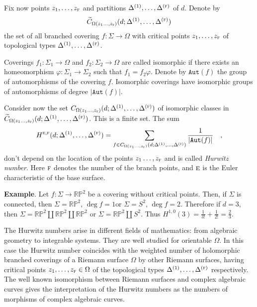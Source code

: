 \documentclass[a4paper,10pt]{article}
\theoremstyle{plain}
\theoremstyle{remark}
\begin{document}
Fix now points $z_1,\dots,z_{\textsc{f}}$ and partitions $\Delta^{(1)},\dots,\Delta^{(\textsc{f})}$ of $d$. Denote by
\[\widetilde{C}_{\Omega (z_1\dots,z_{\textsc{f}})} (d;\Delta^{(1)},\dots,\Delta^{(\textsc{f})})\]
the set of all branched covering $f:\Sigma\rightarrow\Omega$ with critical points $z_1,\dots,z_{\textsc{f}}$ of topological
types  $\Delta^{(1)},\dots,\Delta^{(\textsc{f})}$.

Coverings $f_1:\Sigma_1\rightarrow\Omega$ and $f_2:\Sigma_2\rightarrow\Omega$ are called isomorphic if there exists an
homeomorphism $\varphi:\Sigma_1\rightarrow\Sigma_2$ such that $f_1=f_2\varphi$. Denote by $\texttt{Aut}(f)$  the group of
automorphisms of the covering $f$. Isomorphic coverings have isomorphic groups of automorphisms of degree $|\texttt{Aut}(f)|$.

Consider now the set $C_{\Omega (z_1\dots,z_{\textsc{f}})} (d;\Delta^{(1)},\dots,\Delta^{(\textsc{f})})$ of isomorphic classes
in $\widetilde{C}_{\Omega (z_1\dots,z_{\textsc{f}})} (d;\Delta^{(1)},\dots,\Delta^{(\textsc{f})})$. This is a finite set.
The sum
\[
H^{\textsc{e},\textsc{f}}(d;\Delta^{(1)},\dots,\Delta^{(\textsc{f})})=
\sum\limits_{f\in C_{\Omega (z_1\dots,z_{\textsc{f}})}(d;\Delta^{(1)},\dots,
\Delta^{(\textsc{f})})}\frac{1} {|\texttt{Aut}(f)|}\quad,
\]
don't depend on the location of the points $z_1\dots,z_{\textsc{f}}$ and is called \textit{Hurwitz number}.
Here $\textsc{f}$ denotes the number of the branch points, and $\textsc{e}$ is the Euler characteristic of the base surface.

\vspace{1ex}
{\bf Example}.
Let $f:\Sigma\rightarrow\mathbb{RP}^2$ be a covering without critical points.
Then, if $\Sigma$ is connected, then $\Sigma=\mathbb{RP}^2$,
$\deg f=1$\quad or $\Sigma=S^2$, $\deg f=2$. Therefore if $d=3$, then
$\Sigma=\mathbb{RP}^2\coprod\mathbb{RP}^2\coprod\mathbb{RP}^2$ or $\Sigma=\mathbb{RP}^2\coprod S^2$.
Thus $H^{1,0}(3)=\frac{1}{3!}+\frac{1}{2!}=\frac{2}{3}$.


\vspace{1ex}

The Hurwitz numbers arise in different fields of mathematics: from algebraic geometry to integrable systems. They are well
studied for orientable $\Omega$. In this case the Hurwitz number coincides with the weighted number of holomorphic branched
coverings of a Riemann surface $\Omega$ by other Riemann surfaces, having critical points $z_1,\dots,z_\textsc{f}\in\Omega$ of
the topological types $\Delta^{(1)},\dots,\Delta^{(\textsc{f})}$ respectively. The well known isomorphism between Riemann
surfaces and complex algebraic curves gives the interpretation of the Hurwitz numbers as the numbers of morphisms of
complex algebraic curves.
\end{document}
